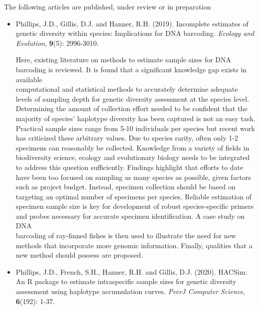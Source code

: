 \vspace{5mm}

The following articles are published, under review or in preparation

\begin{itemize}

\item Phillips, J.D., Gillis, D.J. and Hanner, R.H. (2019). Incomplete estimates of genetic diversity within species: Implications for DNA barcoding. \textit{Ecology and Evolution}, \textbf{9}(5): 2996-3010.

Here, existing literature on methods to estimate sample sizes for DNA barcoding is reviewed. It is found that a significant knowledge gap exists in available \\ computational and statistical methods to accurately determine adequate levels of sampling depth for genetic diversity assessment at the species level. Determining the amount of collection effort needed to be confident that the majority of species’ haplotype diversity has been captured is not an easy task. Practical sample sizes range from 5-10 individuals per species but recent work has criticized these arbitrary values. Due to species rarity, often only 1-2 specimens can reasonably be collected. Knowledge from a variety of fields in biodiversity science, ecology and evolutionary biology needs to be integrated to address this question sufficiently. Findings highlight that efforts to date have been too focused on sampling as many species as possible, given factors such as project budget. Instead, specimen collection should be based on targeting an optimal number of specimens per species. Reliable estimation of specimen sample size is key for development of robust species-specific primers and probes necessary for accurate specimen identification. A case study on DNA \\ barcoding of ray-finned fishes is then used to illustrate the need for new methods that incorporate more genomic information. Finally, qualities that a new method should possess are proposed. 

\vspace{1mm}

\item Phillips, J.D., French, S.H., Hanner, R.H. and Gillis, D.J. (2020). HACSim: An R package to estimate intraspecific sample sizes for genetic diversity assessment using haplotype accumulation curves. \textit{PeerJ Computer Science}, \textbf{6}(192): 1-37.


\end{itemize}
